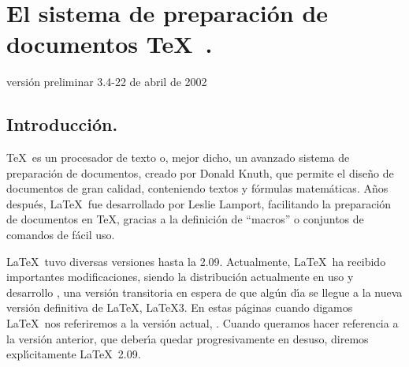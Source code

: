 %
%
%





\setcounter{chapter}{4}
\chapter{El sistema de preparaci{\'o}n de documentos \TeX\ .}

\vspace{-1cm}
\hfill {\tiny versi{\'o}n preliminar 3.4-22 de abril de 2002}

\section{Introducci{\'o}n.}

\TeX\ es un procesador de texto o, mejor dicho, un avanzado sistema de
preparaci{\'o}n de documentos, creado por Donald Knuth, que permite el
dise{\~n}o de documentos de gran calidad, conteniendo textos y f{\'o}rmulas
matem{\'a}ticas. A{\~n}os despu{\'e}s, \LaTeX\ fue desarrollado por Leslie
Lamport, facilitando la preparaci{\'o}n de documentos en \TeX, gracias a
la definici{\'o}n de ``macros'' o conjuntos de comandos de f{\'a}cil uso.

\LaTeX\ tuvo diversas versiones hasta la 2.09. Actualmente, \LaTeX\ ha
recibido importantes modificaciones, siendo la distribuci{\'o}n
actualmente en uso y desarrollo \LaTeXe, una versi{\'o}n transitoria en
espera de que alg{\'u}n d{\'\i}a se llegue a la nueva versi{\'o}n definitiva de
\LaTeX, \LaTeX 3. En estas p{\'a}ginas cuando digamos \LaTeX\ nos
referiremos a la versi{\'o}n actual, \LaTeXe. Cuando queramos hacer
referencia a la versi{\'o}n anterior, que deber{\'\i}a quedar progresivamente
en desuso, diremos expl{\'\i}citamente \LaTeX\ 2.09.

